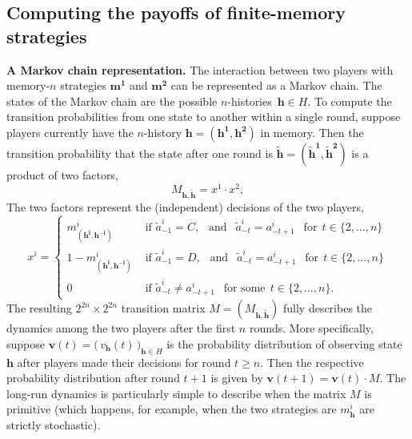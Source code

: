 \documentclass[11pt]{article}
\theoremstyle{plainCl1}
\theoremstyle{plainCl2}
\begin{document}
\subsection{Computing the payoffs of finite-memory strategies} \label{Sec:PayoffComputation}


\noindent
{\bf A Markov chain representation.}
The interaction between two players with memory-\(n\) strategies \(\mathbf{m^{1}}\) and \(\mathbf{m^{2}}\) can be represented as a Markov chain. 
The states of the Markov chain are the possible $n$-histories~$\mathbf{h}\!\in\!H$. 
To compute the transition probabilities from one state to another within a single round, suppose  players currently have the $n$-history \(\mathbf{h}\!=\!(\mathbf{h^1}, \mathbf{h^2})\) in memory.
Then the transition probability that the state after one round is $\mathbf{\tilde h}\!=\!(\mathbf{\tilde h^1},\mathbf{\tilde h^2})$ is a product of two factors,
\begin{equation}\label{Eq:TransitionMatrix}
M_{\mathbf{h}, \mathbf{\tilde h}} = x^1 \cdot x^2,
\end{equation}
The two factors represent the (independent) decisions of the two players,
\begin{equation}
x^i = \left\{
\begin{array}{ll}
  m^{i}_{(\mathbf{h^i},\mathbf{h^{-i}})} & \text{ if } \tilde{a}^i_{-1} \!=\! C, ~~\text{ and }~~ \tilde a^i_{-t} \!=\! a^i_{-t + 1} ~~\text{ for}~~t\!\in\!\{2,\ldots,n\}\\[0.1cm]
  1 \!-\! m^{i}_{(\mathbf{h^i},\mathbf{h^{-i}})} & \text{ if } \tilde{a}^i_{-1} \!=\! D, ~~\text{ and }~~ \tilde a^i_{-t} \!=\! a^i_{-t + 1} ~~\text{ for}~~t\!\in\!\{2,\ldots,n\}\\[0.1cm]
  0 & \text{ if } \tilde a^i_{-t} \neq  a^i_{-t + 1}~~\text{ for some}~~t\!\in\!\{2,\ldots,n\}.
\end{array}
\right.
\end{equation}
The resulting  \(2^{2n} \times 2^{2n}\) transition matrix $M\!=\!(M_{\mathbf{h},\mathbf{\tilde h}})$ fully describes the dynamics among the two players after the first $n$ rounds. 
More specifically, suppose $\mathbf{v}(t) \!=\! \big(\,v_\mathbf{h}(t)\,\big)_{\mathbf{h}\in H}$ is the probability distribution of observing state~$\mathbf{h}$ after players made their decisions for round $t\!\ge\!n$.
Then the respective probability distribution after round $t\!+\!1$ is given by $\mathbf{v}(t\!+\!1) \!=\! \mathbf{v}(t)\cdot M$. 
The long-run dynamics is particularly simple to describe when the matrix $M$ is primitive (which happens, for example, when the two strategies are $m^i_\mathbf{h}$ are strictly stochastic). 
\end{document}

